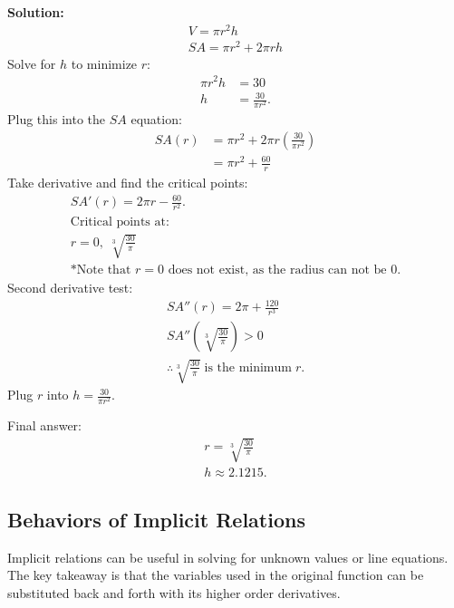 \documentclass[12pt]{article}
\begin{document}
\begin{enumerate}
          \noindent \textbf{Solution:}
          \begin{gather*}
              V = \pi r^2 h \\
              SA = \pi r^2 + 2\pi rh
          \end{gather*}
          Solve for $h$ to minimize $r$:
          \begin{align*}
              \pi r^2 h & = 30                  \\
              h         & = \frac{30}{\pi r^2}.
          \end{align*}
          Plug this into the $SA$ equation:
          \begin{align*}
              SA(r) & = \pi r^2 + 2\pi r \left( \frac{30}{\pi r^2} \right) \\[6pt]
                    & = \pi r^2 + \frac{60}{r}
          \end{align*}
          Take derivative and find the critical points:
          \begin{gather*}
              SA'(r) = 2 \pi r - \frac{60}{r^2}. \\[6pt]
              \text{Critical points at:} \\
              r = 0, \; \sqrt[3]{\frac{30}{\pi}} \\[6pt]
              \text{*Note that $r=0$ does not exist, as the radius can not be $0$.}
          \end{gather*}
          Second derivative test:
          \begin{gather*}
              SA''(r) = 2 \pi + \frac{120}{r^3} \\[6pt]
              SA'' \left( \sqrt[3]{\frac{30}{\pi}} \right) > 0 \\[6pt]
              \therefore \sqrt[3]{\frac{30}{\pi}} \; \text{is the minimum} \; r.
          \end{gather*}
          Plug $r$ into $h=\frac{30}{\pi r^2}$.

          \noindent Final answer:
          \begin{gather*}
              r = \sqrt[3]{\frac{30}{\pi}} \\[6pt]
              h \approx 2.1215.
          \end{gather*}
\end{enumerate}

\subsection{Behaviors of Implicit Relations} %
Implicit relations can be useful in solving for unknown values or line equations. The key takeaway is that the variables used in the original function can be substituted back and forth with its higher order derivatives.
\end{document}
